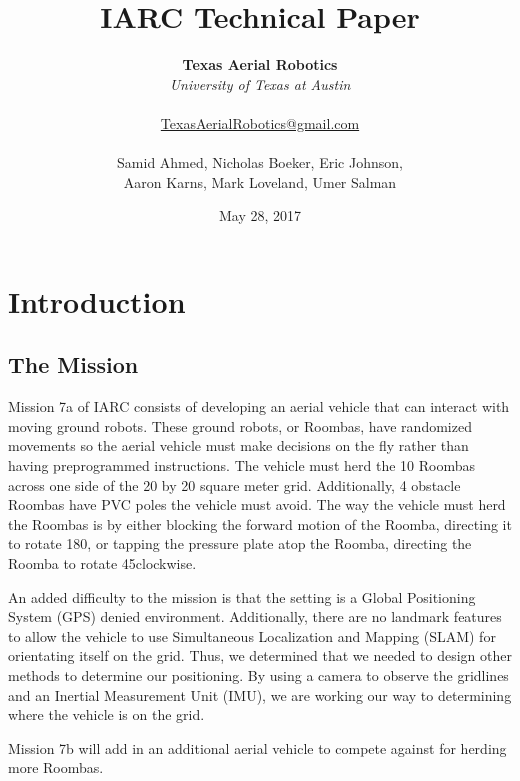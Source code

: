 \documentclass[12pt]{article}
\title{IARC Technical Paper}
\author{
	\textbf{Texas Aerial Robotics} \\ 
	\textit{University of Texas at Austin} \\ \\ 
	\href{mailto:TexasAerialRobotics@gmail.com}{TexasAerialRobotics@gmail.com} \\ \\ 
	Samid Ahmed, Nicholas Boeker, Eric Johnson, \\ Aaron Karns, Mark Loveland, Umer Salman}
\date{May 28, 2017}
\begin{document}
\maketitle
\thispagestyle{empty}


\pagebreak
\tableofcontents

\pagebreak

\section{Introduction}
\subsection{The Mission}
Mission 7a of IARC consists of developing an aerial vehicle that can interact with moving ground robots. These ground robots, or Roombas, have randomized movements so the aerial vehicle must make decisions on the fly rather than having preprogrammed instructions. The vehicle must herd the 10 Roombas across one side of the 20 by 20 square meter grid. Additionally, 4 obstacle Roombas have PVC poles the vehicle must avoid. The way the vehicle must herd the Roombas is by either blocking the forward motion of the Roomba, directing it to rotate 180\degree, or tapping the pressure plate atop the Roomba, directing the Roomba to rotate 45\degree clockwise. 

An added difficulty to the mission is that the setting is a Global Positioning System (GPS) denied environment. Additionally, there are no landmark features to allow the vehicle to use Simultaneous Localization and Mapping (SLAM) for orientating itself on the grid. Thus, we determined that we needed to design other methods to determine our positioning. By using a camera to observe the gridlines and an Inertial Measurement Unit (IMU), we are working our way to determining where the vehicle is on the grid. 

Mission 7b will add in an additional aerial vehicle to compete against for herding more Roombas. 
\end{document}
